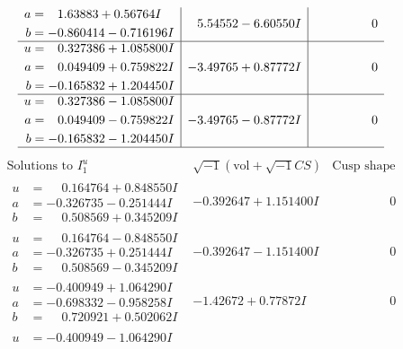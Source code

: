 \documentclass[1p]{elsarticle_modified}
\theoremstyle{definition}
\newcommand{\I}{\sqrt{-1}}
\begin{document}
$$\begin{array}{c|c|c}
\begin{aligned}
a &= \phantom{-}1.63883 + 0.56764 I \\
b &= -0.860414 - 0.716196 I\end{aligned}
 & \phantom{-}5.54552 - 6.60550 I & \phantom{-0.000000 } 0 \\ \hline\begin{aligned}
u &= \phantom{-}0.327386 + 1.085800 I \\
a &= \phantom{-}0.049409 + 0.759822 I \\
b &= -0.165832 + 1.204450 I\end{aligned}
 & -3.49765 + 0.87772 I & \phantom{-0.000000 } 0 \\ \hline\begin{aligned}
u &= \phantom{-}0.327386 - 1.085800 I \\
a &= \phantom{-}0.049409 - 0.759822 I \\
b &= -0.165832 - 1.204450 I\end{aligned}
 & -3.49765 - 0.87772 I & \phantom{-0.000000 } 0\\
 \hline 
 \end{array}$$\newpage$$\begin{array}{c|c|c}  
\text{Solutions to }I^u_{1}& \I (\text{vol} + \sqrt{-1}CS) & \text{Cusp shape}\\
 \hline 
\begin{aligned}
u &= \phantom{-}0.164764 + 0.848550 I \\
a &= -0.326735 - 0.251444 I \\
b &= \phantom{-}0.508569 + 0.345209 I\end{aligned}
 & -0.392647 + 1.151400 I & \phantom{-0.000000 } 0 \\ \hline\begin{aligned}
u &= \phantom{-}0.164764 - 0.848550 I \\
a &= -0.326735 + 0.251444 I \\
b &= \phantom{-}0.508569 - 0.345209 I\end{aligned}
 & -0.392647 - 1.151400 I & \phantom{-0.000000 } 0 \\ \hline\begin{aligned}
u &= -0.400949 + 1.064290 I \\
a &= -0.698332 - 0.958258 I \\
b &= \phantom{-}0.720921 + 0.502062 I\end{aligned}
 & -1.42672 + 0.77872 I & \phantom{-0.000000 } 0 \\ \hline\begin{aligned}
u &= -0.400949 - 1.064290 I \\

\end{aligned}
\end{array}$$
\end{document}

